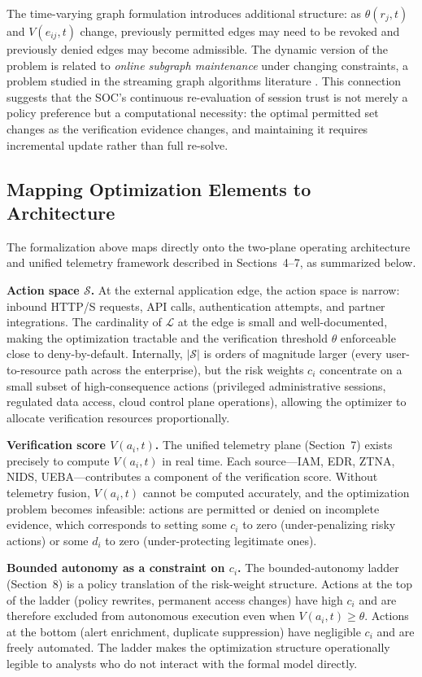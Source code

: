 \documentclass[unnumsec,webpdf,contemporary,large]{oup-authoring-template}
\theoremstyle{thmstyleone}
\theoremstyle{thmstyletwo}
\theoremstyle{thmstylethree}
\begin{document}
\begin{appendices}
The time-varying graph formulation introduces additional structure: as $\theta(r_j, t)$
and $V(e_{ij}, t)$ change, previously permitted edges may need to be revoked and
previously denied edges may become admissible. The dynamic version of the problem
is related to \textit{online subgraph maintenance} under changing constraints, a
problem studied in the streaming graph algorithms literature
\cite{mcgregor2014streaming}. This connection suggests that the SOC's continuous
re-evaluation of session trust is not merely a policy preference but a computational
necessity: the optimal permitted set changes as the verification evidence changes,
and maintaining it requires incremental update rather than full re-solve.

\subsection{Mapping Optimization Elements to Architecture}
\label{app:A6}

The formalization above maps directly onto the two-plane operating architecture and
unified telemetry framework described in Sections~4--7, as summarized below.

\textbf{Action space $\mathcal{S}$.} At the external application edge, the action
space is narrow: inbound HTTP/S requests, API calls, authentication attempts, and
partner integrations. The cardinality of $\mathcal{L}$ at the edge is small and
well-documented, making the optimization tractable and the verification threshold
$\theta$ enforceable close to deny-by-default. Internally, $|\mathcal{S}|$ is
orders of magnitude larger (every user-to-resource path across the enterprise),
but the risk weights $c_i$ concentrate on a small subset of high-consequence actions
(privileged administrative sessions, regulated data access, cloud control plane
operations), allowing the optimizer to allocate verification resources
proportionally.

\textbf{Verification score $V(a_i, t)$.} The unified telemetry plane (Section~7)
exists precisely to compute $V(a_i, t)$ in real time. Each source---IAM, EDR,
ZTNA, NIDS, UEBA---contributes a component of the verification score. Without
telemetry fusion, $V(a_i, t)$ cannot be computed accurately, and the optimization
problem becomes infeasible: actions are permitted or denied on incomplete evidence,
which corresponds to setting some $c_i$ to zero (under-penalizing risky actions)
or some $d_i$ to zero (under-protecting legitimate ones).

\textbf{Bounded autonomy as a constraint on $c_i$.} The bounded-autonomy ladder
(Section~8) is a policy translation of the risk-weight structure. Actions at the
top of the ladder (policy rewrites, permanent access changes) have high $c_i$ and
are therefore excluded from autonomous execution even when $V(a_i, t) \geq \theta$.
Actions at the bottom (alert enrichment, duplicate suppression) have negligible
$c_i$ and are freely automated. The ladder makes the optimization structure
operationally legible to analysts who do not interact with the formal model directly.


\end{appendices}
\end{document}
